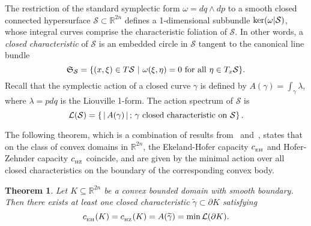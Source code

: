 \documentclass{icmart}
\newtheorem{theorem}{Theorem}[section]
\theoremstyle{definition}
\begin{document}
The restriction of the standard symplectic form
$\omega=dq \wedge dp$ to a smooth closed connected 
hypersurface ${\mathcal S}
\subset {\mathbb R}^{2n}$ defines a 1-dimensional subbundle
${\rm ker}(\omega | {\mathcal S})$, whose integral curves comprise the
characteristic foliation of ${\mathcal S}$. In other words, a {\it closed
characteristic}  of  ${\mathcal S}$ is an embedded circle
in  ${\mathcal S}$ tangent to the canonical %
line bundle
\begin{equation*} {\mathfrak S}_{{\mathcal S}} = \{(x,\xi) \in T
{\mathcal S} \ | \ \omega(\xi,\eta) = 0 \ {\rm for \ all} \ \eta \in T_x
{\mathcal S} \}. \end{equation*}
Recall that the symplectic action %
of a closed curve $\gamma$ %
is defined by $A(\gamma) = \int_{\gamma} \lambda$,
where  $\lambda =pdq$ is the Liouville 1-form. %
The action spectrum of ${\mathcal S}$ is %
\begin{equation*}  {\cal L}({\mathcal S}) = \left \{ \, | \, {A}({\gamma}) \,  | \, ;
\, \gamma \ {\rm closed \ characteristic \ on} \  {\mathcal S}
\right \}.\end{equation*}


The following theorem, which is a combination of results from~\cite{EH} and~\cite{HZ}, states that on the class of convex domains in ${\mathbb R}^{2n}$,  the  Ekeland-Hofer capacity $c_{_{\rm EH}}$ and Hofer-Zehnder capacity $c_{_{\rm HZ}}$ coincide, 
and are given by the minimal action over all closed characteristics on the boundary of the corresponding convex body. 
%
%
\begin{theorem} \label{Cap_on_covex_sets} Let $ K \subseteq {\mathbb
R}^{2n}$ be a convex bounded domain with smooth boundary. %
Then there exists at least one closed characteristic $\widetilde \gamma
\subset \partial K$ satisfying
\begin{equation*} 
 c_{_{\rm EH}}(K) = c_{_{\rm HZ}}(K)= { A}(\widetilde \gamma) =  \min {\cal
L}( \partial K). \end{equation*}
\end{theorem}
\end{document}
